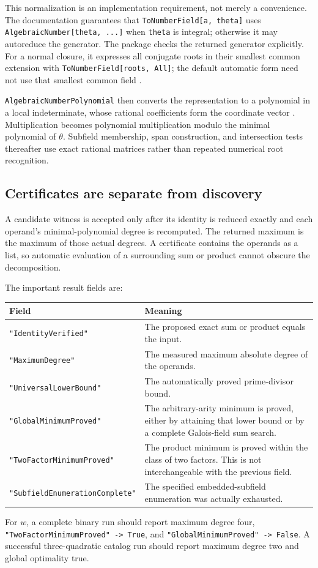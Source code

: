 \documentclass[11pt,a4paper]{article}
\theoremstyle{definition}\newtheorem{definition}[theorem]{Definition}
\theoremstyle{remark}\newtheorem{remark}[theorem]{Remark}
\newcommand{\wl}[1]{\texttt{#1}}
\begin{document}
This normalization is an implementation requirement, not merely a convenience. The documentation guarantees that \wl{ToNumberField[a, theta]} uses \wl{AlgebraicNumber[theta, ...]} when \wl{theta} is integral; otherwise it may autoreduce the generator. The package checks the returned generator explicitly. For a normal closure, it expresses all conjugate roots in their smallest common extension with \wl{ToNumberField[roots, All]}; the default automatic form need not use that smallest common field \cite{tonumberfield}.

\wl{AlgebraicNumberPolynomial} then converts the representation to a polynomial in a local indeterminate, whose rational coefficients form the coordinate vector \cite{anpoly}. Multiplication becomes polynomial multiplication modulo the minimal polynomial of $\theta$. Subfield membership, span construction, and intersection tests thereafter use exact rational matrices rather than repeated numerical root recognition.

\subsection{Certificates are separate from discovery}
A candidate witness is accepted only after its identity is reduced exactly and each operand's minimal-polynomial degree is recomputed. The returned maximum is the maximum of those actual degrees. A certificate contains the operands as a list, so automatic evaluation of a surrounding sum or product cannot obscure the decomposition.

The important result fields are:
\begin{center}
\small
\begin{tabularx}{\linewidth}{@{}p{.39\linewidth}X@{}}
\toprule
Field & Meaning\\
\midrule
\wl{"IdentityVerified"} & The proposed exact sum or product equals the input.\\
\wl{"MaximumDegree"} & The measured maximum absolute degree of the operands.\\
\wl{"UniversalLowerBound"} & The automatically proved prime-divisor bound.\\
\wl{"GlobalMinimumProved"} & The arbitrary-arity minimum is proved, either by attaining that lower bound or by a complete Galois-field sum search.\\
\wl{"TwoFactorMinimumProved"} & The product minimum is proved within the class of two factors. This is not interchangeable with the previous field.\\
\wl{"SubfieldEnumerationComplete"} & The specified embedded-subfield enumeration was actually exhausted.\\
\bottomrule
\end{tabularx}
\end{center}
For $w$, a complete binary run should report maximum degree four, \wl{"TwoFactorMinimumProved" -> True}, and \wl{"GlobalMinimumProved" -> False}. A successful three-quadratic catalog run should report maximum degree two and global optimality true.
\end{document}
